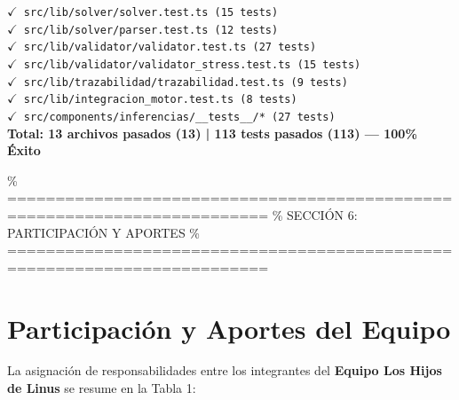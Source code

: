 \documentclass[11pt,a4paper]{article}
\begin{document}
\vspace{0.2cm}
\begin{tcolorbox}[colback=lightbg,colframe=accentblue,arc=2mm,title=\textbf{Resultados de la Suite de Pruebas (Vitest)}]
\texttt{$\checkmark$ src/lib/solver/solver.test.ts (15 tests)}\\
\texttt{$\checkmark$ src/lib/solver/parser.test.ts (12 tests)}\\
\texttt{$\checkmark$ src/lib/validator/validator.test.ts (27 tests)}\\
\texttt{$\checkmark$ src/lib/validator/validator\_stress.test.ts (15 tests)}\\
\texttt{$\checkmark$ src/lib/trazabilidad/trazabilidad.test.ts (9 tests)}\\
\texttt{$\checkmark$ src/lib/integracion\_motor.test.ts (8 tests)}\\
\texttt{$\checkmark$ src/components/inferencias/\_\_tests\_\_/* (27 tests)}\\
\textbf{\textcolor{commentgreen}{Total: 13 archivos pasados (13) | 113 tests pasados (113) --- 100\% Éxito}}
\end{tcolorbox}

\% =========================================================================
\% SECCIÓN 6: PARTICIPACIÓN Y APORTES
\% =========================================================================
\newpage
\section{Participación y Aportes del Equipo}

La asignación de responsabilidades entre los integrantes del \textbf{Equipo Los Hijos de Linus} se resume en la Tabla 1:
\end{document}
